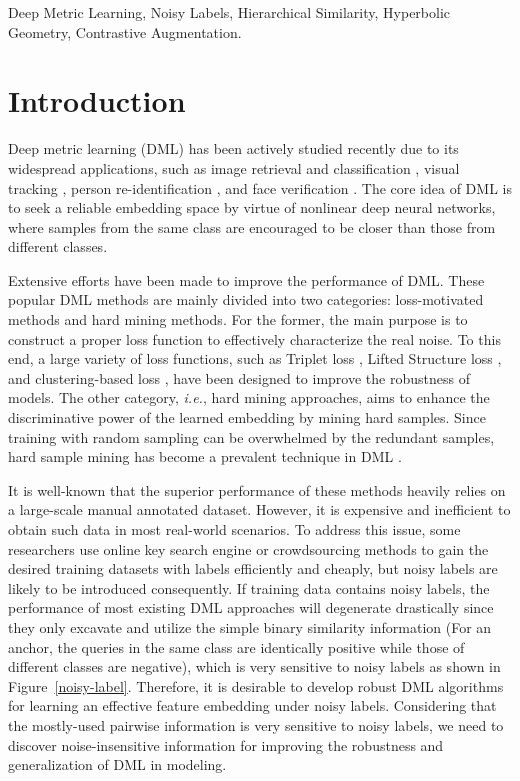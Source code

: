 \documentclass[lettersize,journal]{IEEEtran}
\begin{document}
\begin{IEEEkeywords}
Deep Metric Learning, Noisy Labels, Hierarchical Similarity, Hyperbolic Geometry, Contrastive Augmentation.
\end{IEEEkeywords}

\section{Introduction}
 Deep metric learning (DML) has been actively studied recently due to its widespread applications, such as image retrieval and classification \cite{chopra2005learning,he2018triplet,zhou2017efficient}, visual tracking \cite{tao2016siamese}, person re-identification \cite{yi2014deep,yu2018hard}, and face verification \cite{hu2014discriminative,lu2017discriminative,liu2017adaptive}. The core idea of DML is to seek a reliable embedding space by virtue of nonlinear deep neural networks, where samples from the same class are encouraged to be closer than those from different classes. 

Extensive efforts  \cite{wang2017deep,oh2017deep,duan2018deep,kim2018attention,wang2019ranked,suh2019stochastic,wang2020cross,kim2020proxy,sun2020circle}  have been made to improve the performance of DML. These popular DML methods are mainly divided into two categories: loss-motivated methods and hard mining methods. For the former, the main purpose is to construct  a proper loss function to effectively characterize the real noise. To this end, a large variety of loss functions, such as Triplet loss \cite{hoffer2015deep}, Lifted Structure loss \cite{oh2016deep}, and clustering-based loss \cite{oh2017deep}, have been designed to improve the robustness of models. The other category, \textit{i.e.},  hard mining approaches,  aims  to enhance the discriminative power of the learned embedding by mining hard samples. Since training with random sampling can be overwhelmed by the redundant samples, hard sample mining has become a prevalent technique in DML \cite{oh2016deep,duan2018deep,ge2018deep}.


It is well-known that the superior performance of these methods heavily relies on a large-scale manual annotated dataset. However, it is expensive and inefficient to obtain such data in most real-world scenarios. To address this issue, some researchers use online key search engine \cite{li2017webvision} or crowdsourcing \cite{yu2018learning} methods to gain the desired training datasets with labels efficiently and cheaply, but noisy labels are likely to be introduced consequently. If training data contains  noisy labels, the performance of most existing DML approaches will degenerate drastically since they only excavate and  utilize the simple binary similarity information (For an anchor, the queries in the same class are identically positive while those of different classes are negative), which is very sensitive to noisy labels as shown in Figure~\ref{noisy-label}.  Therefore, it is desirable to develop robust DML algorithms for learning  an effective feature embedding under noisy labels. Considering that the mostly-used pairwise information is very sensitive to noisy labels, we need to discover noise-insensitive information for improving the robustness and generalization of DML in modeling.
\end{document}
